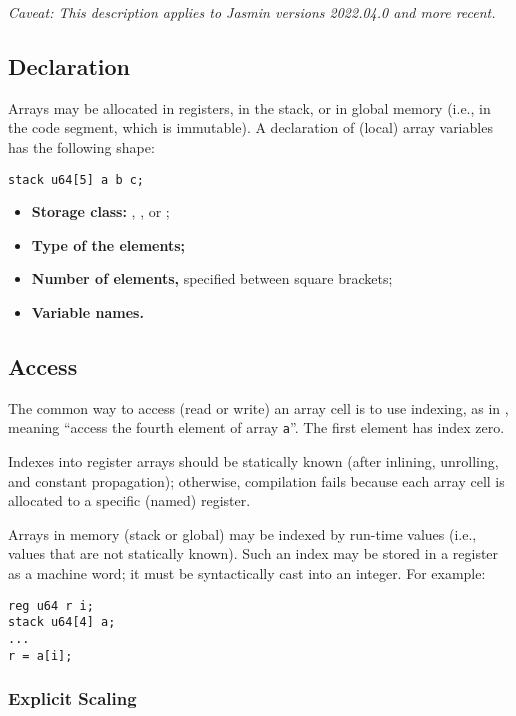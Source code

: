 \textit{Caveat: This description applies to Jasmin versions 2022.04.0 and more recent.}

\subsection{Declaration}

Arrays may be allocated in registers, in the stack, or in global memory (i.e., in the code segment, which is immutable). A declaration of (local) array variables has the following shape:

\begin{lstlisting}[style=jasmin]
stack u64[5] a b c;
\end{lstlisting}

\begin{itemize}
	\item \textbf{Storage class:} , ,  or ;
	\item \textbf{Type of the elements;}
	\item \textbf{Number of elements,} specified between square brackets;
	\item \textbf{Variable names.}
\end{itemize}

\subsection{Access}

The common way to access (read or write) an array cell is to use indexing, as in , meaning “access the fourth element of array \texttt{a}”. The first element has index zero.

Indexes into register arrays should be statically known (after inlining, unrolling, and constant propagation); otherwise, compilation fails because each array cell is allocated to a specific (named) register.

Arrays in memory (stack or global) may be indexed by run-time values (i.e., values that are not statically known). Such an index may be stored in a register as a machine word; it must be syntactically cast into an integer. For example:

\begin{lstlisting}[style=jasmin]
reg u64 r i;
stack u64[4] a;
...
r = a[i];
\end{lstlisting}

\subsubsection{Explicit Scaling}

